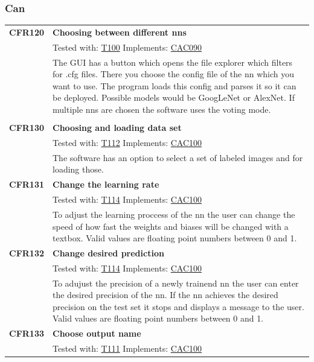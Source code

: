 \documentclass[parskip=full]{scrartcl}
\begin{document}
\newpage

\subsubsection{Can}
\begin{tabular}{p{2cm}p{11.4cm}}
\textbf{CFR120} \hypertarget{CFR120} & \textbf{Choosing between different \glspl{nn}}\\
& Tested with: \hyperlink{T100}{T100} Implements: \hyperlink{CAC090}{CAC090} \\
& The GUI has a button which opens the file explorer which filters for .cfg files. There you choose the config file of the \gls{nn} which you want to use. The program loads this config and parses it so it can be deployed. Possible models would be GoogLeNet or AlexNet. If multiple \glspl{nn} are chosen the software uses the voting mode.\\
& \\
\textbf {CFR130} \hypertarget{CFR130} & \textbf{Choosing and loading data set} \\
& Tested with: \hyperlink{T112}{T112} Implements: \hyperlink{CAC100}{CAC100}\\
& The software has an option to select a set of labeled images and for loading those.\\
\textbf {CFR131} \hypertarget{CFR131} & \textbf{Change the learning rate} \\
& Tested with: \hyperlink{T114}{T114} Implements: \hyperlink{CAC100}{CAC100} \\
& To adjust the learning proccess of the \gls{nn} the user can change the speed of how fast the weights and biases will be changed with a textbox.  Valid values are floating point numbers between 0 and 1.\\
\textbf{CFR132} \hypertarget{CFR132} & \textbf{Change desired prediction}\\
& Tested with: \hyperlink{T114}{T114} Implements: \hyperlink{CAC100}{CAC100}\\
& To adujust the precision of a newly trainend \gls{nn} the user can enter the desired precision of the \gls{nn}. If the \gls{nn} achieves the desired precision on the test set it stops and displays a message to the user. Valid values are floating point numbers between 0 and 1.\\
\textbf{CFR133} \hypertarget{CFR133} & \textbf{Choose output name}\\
& Tested with: \hyperlink{T111}{T111} Implements: \hyperlink{CAC100}{CAC100}\\

\end{tabular}
\end{document}
